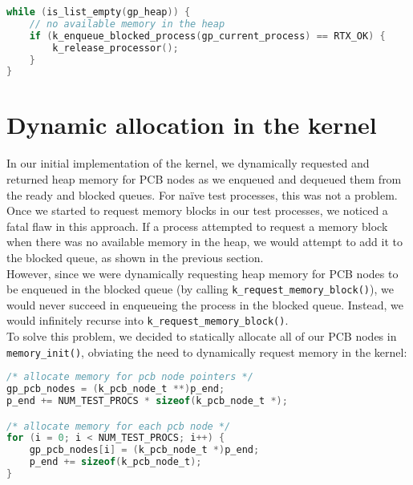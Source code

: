 \documentclass[12pt]{report}
\begin{document}
\begin{minipage}{\textwidth}
\begin{lstlisting}[language=C]
while (is_list_empty(gp_heap)) {
    // no available memory in the heap
    if (k_enqueue_blocked_process(gp_current_process) == RTX_OK) {
        k_release_processor();
    }
}
\end{lstlisting}
\end{minipage}

\section{Dynamic allocation in the kernel}

In our initial implementation of the kernel, we dynamically requested and returned heap memory for PCB nodes as we enqueued and dequeued them from the ready and blocked queues. For naïve test processes, this was not a problem.\\

Once we started to request memory blocks in our test processes, we noticed a fatal flaw in this approach. If a process attempted to request a memory block when there was no available memory in the heap, we would attempt to add it to the blocked queue, as shown in the previous section.\\

However, since we were dynamically requesting heap memory for PCB nodes to be enqueued in the blocked queue (by calling \texttt{k_request_memory_block()}), we would never succeed in enqueueing the process in the blocked queue. Instead, we would infinitely recurse into \texttt{k_request_memory_block()}.\\

To solve this problem, we decided to statically allocate all of our PCB nodes in \texttt{memory_init()}, obviating the need to dynamically request memory in the kernel:

\begin{minipage}{\textwidth}
\begin{lstlisting}[language=C]
/* allocate memory for pcb node pointers */
gp_pcb_nodes = (k_pcb_node_t **)p_end;
p_end += NUM_TEST_PROCS * sizeof(k_pcb_node_t *);

/* allocate memory for each pcb node */
for (i = 0; i < NUM_TEST_PROCS; i++) {
    gp_pcb_nodes[i] = (k_pcb_node_t *)p_end;
    p_end += sizeof(k_pcb_node_t); 
}
\end{lstlisting}
\end{minipage}
\end{document}
